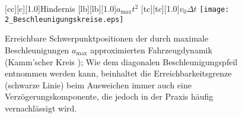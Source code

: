 




		
	
\begin{figure}[h]
	[cc][c][1.0]{Hindernis}
	[lb][lb][1.0]{$a_\text{max}t^2$}
	[tc][tc][1.0]{$v_0 \Delta t$}
\centering
\texttt{[image: 2\_Beschleunigungskreise.eps]}
 \caption[Erreichbare Schwerpunktpositionen]{Erreichbare Schwerpunktpositionen der durch maximale Beschleunigungen $a_\text{max}$ approximierten Fahrzeugdynamik \cite{schmidt2014fahrstrategien} (Kamm'scher Kreis \cite{breuer20012bremsenhandbuch}); Wie dem diagonalen Beschleunigungspfeil entnommen werden kann, beinhaltet die Erreichbarkeitsgrenze (schwarze Linie) beim Ausweichen immer auch eine Verzögerungskomponente, die jedoch in der Praxis häufig vernachlässigt wird.}
 \label{fig:Beschleunigungskreise}
\end{figure} 








